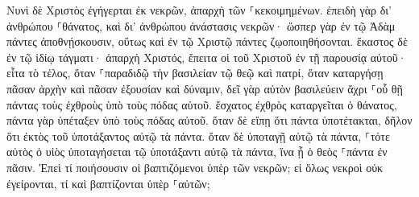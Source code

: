 \documentclass{openreader}
\begin{document}
Νυνὶ δὲ Χριστὸς ἐγήγερται ἐκ νεκρῶν, ἀπαρχὴ τῶν ⸀κεκοιμημένων. 
ἐπειδὴ γὰρ δι’ ἀνθρώπου ⸀θάνατος, καὶ δι’ ἀνθρώπου ἀνάστασις νεκρῶν· 
ὥσπερ γὰρ ἐν τῷ Ἀδὰμ πάντες ἀποθνῄσκουσιν, οὕτως καὶ ἐν τῷ Χριστῷ πάντες ζῳοποιηθήσονται. 
ἕκαστος δὲ ἐν τῷ ἰδίῳ τάγματι· ἀπαρχὴ Χριστός, ἔπειτα οἱ τοῦ Χριστοῦ ἐν τῇ παρουσίᾳ αὐτοῦ· 
εἶτα τὸ τέλος, ὅταν ⸀παραδιδῷ τὴν βασιλείαν τῷ θεῷ καὶ πατρί, ὅταν καταργήσῃ πᾶσαν ἀρχὴν καὶ πᾶσαν ἐξουσίαν καὶ δύναμιν, 
δεῖ γὰρ αὐτὸν βασιλεύειν ἄχρι ⸀οὗ θῇ πάντας τοὺς ἐχθροὺς ὑπὸ τοὺς πόδας αὐτοῦ. 
ἔσχατος ἐχθρὸς καταργεῖται ὁ θάνατος, 
πάντα γὰρ ὑπέταξεν ὑπὸ τοὺς πόδας αὐτοῦ. ὅταν δὲ εἴπῃ ὅτι πάντα ὑποτέτακται, δῆλον ὅτι ἐκτὸς τοῦ ὑποτάξαντος αὐτῷ τὰ πάντα. 
ὅταν δὲ ὑποταγῇ αὐτῷ τὰ πάντα, ⸀τότε αὐτὸς ὁ υἱὸς ὑποταγήσεται τῷ ὑποτάξαντι αὐτῷ τὰ πάντα, ἵνα ᾖ ὁ θεὸς ⸀πάντα ἐν πᾶσιν. 
Ἐπεὶ τί ποιήσουσιν οἱ βαπτιζόμενοι ὑπὲρ τῶν νεκρῶν; εἰ ὅλως νεκροὶ οὐκ ἐγείρονται, τί καὶ βαπτίζονται ὑπὲρ ⸀αὐτῶν; 
\end{document}
